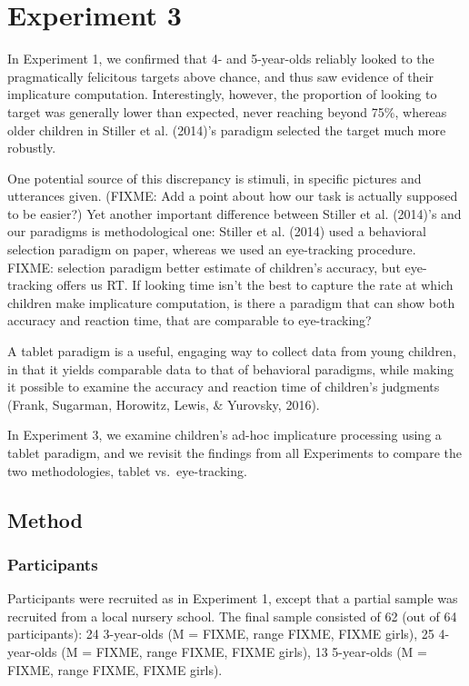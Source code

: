 \documentclass[a4paper,man,apacite,floatsintext]{apa6}
\begin{document}
\section{Experiment 3}\label{experiment-3}

In Experiment 1, we confirmed that 4- and 5-year-olds reliably looked to
the pragmatically felicitous targets above chance, and thus saw evidence
of their implicature computation. Interestingly, however, the proportion
of looking to target was generally lower than expected, never reaching
beyond 75\%, whereas older children in Stiller et al. (2014)'s paradigm
selected the target much more robustly.

One potential source of this discrepancy is stimuli, in specific
pictures and utterances given. (FIXME: Add a point about how our task is
actually supposed to be easier?) Yet another important difference
between Stiller et al. (2014)'s and our paradigms is methodological one:
Stiller et al. (2014) used a behavioral selection paradigm on paper,
whereas we used an eye-tracking procedure. FIXME: selection paradigm
better estimate of children's accuracy, but eye-tracking offers us RT.
If looking time isn't the best to capture the rate at which children
make implicature computation, is there a paradigm that can show both
accuracy and reaction time, that are comparable to eye-tracking?

A tablet paradigm is a useful, engaging way to collect data from young
children, in that it yields comparable data to that of behavioral
paradigms, while making it possible to examine the accuracy and reaction
time of children's judgments (Frank, Sugarman, Horowitz, Lewis, \&
Yurovsky, 2016).

In Experiment 3, we examine children's ad-hoc implicature processing
using a tablet paradigm, and we revisit the findings from all
Experiments to compare the two methodologies, tablet vs.~eye-tracking.

\subsection{Method}\label{method-2}

\subsubsection{Participants}\label{participants-2}

Participants were recruited as in Experiment 1, except that a partial
sample was recruited from a local nursery school. The final sample
consisted of 62 (out of 64 participants): 24 3-year-olds (M = FIXME,
range FIXME, FIXME girls), 25 4-year-olds (M = FIXME, range FIXME, FIXME
girls), 13 5-year-olds (M = FIXME, range FIXME, FIXME girls).
\end{document}
